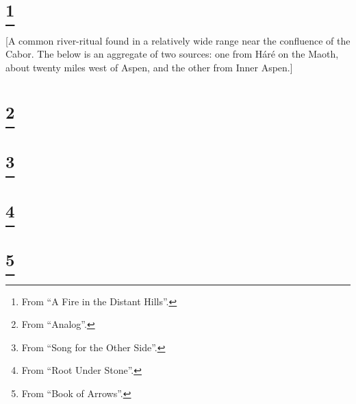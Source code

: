 \documentclass{article}
\let\oldthefootnote\thefootnote
\newcommand\oocfootnote[2][DarkGreen]{\renewcommand\thefootnote{\color{#1}\oldthefootnote}%
  \footnote{\color{#1}#2}%
  \renewcommand{\thefootnote}{\oldthefootnote}}
\begin{document}

\begin{verse}
\end{verse}


\section{\oocfootnote{From ``A Fire in the Distant Hills''.}}

[A common river-ritual found in a relatively wide range near the confluence of the Cabor. The below is an aggregate of two sources: one from Háré on the Maoth, about twenty miles west of Aspen, and the other from Inner Aspen.]

\begin{verse}
\end{verse}


\section{\oocfootnote{From ``Analog''.}}


\begin{verse}
\end{verse}


\section{\oocfootnote{From ``Song for the Other Side''.}}


\begin{verse}
\end{verse}


\section{\oocfootnote{From ``Root Under Stone''.}}


\begin{verse}
\end{verse}


\section{\oocfootnote{From ``Book of Arrows''.}}


\begin{verse}
\end{verse}
\end{document}
